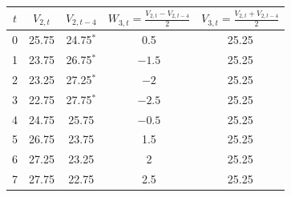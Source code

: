 \begin{tabular}{ccccc}
\toprule
$t$ & $V_{2,t}$ & $V_{2,t-4}$ & $W_{3,t}=\frac{V_{2,t}-V_{2,t-4}}{2}$ & $V_{3,t}=\frac{V_{2,t}+V_{2,t-4}}{2}$ \\
\midrule
0 & 25.75 & 24.75$^{\ast}$ & 0.5 & 25.25 \\
1 & 23.75 & 26.75$^{\ast}$ & $-1.5$ & 25.25 \\
2 & 23.25 & 27.25$^{\ast}$ & $-2$ & 25.25 \\
3 & 22.75 & 27.75$^{\ast}$ & $-2.5$ & 25.25 \\
4 & 24.75 & 25.75 & $-0.5$ & 25.25 \\
5 & 26.75 & 23.75 & 1.5 & 25.25 \\
6 & 27.25 & 23.25 & 2 & 25.25 \\
7 & 27.75 & 22.75 & 2.5 & 25.25 \\
\bottomrule
\end{tabular}